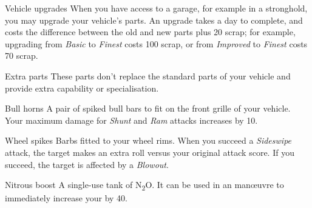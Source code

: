 \begin{abstractsection}{Vehicle upgrades}
  When you have access to a garage, for example in a stronghold, you may upgrade your vehicle's parts. An upgrade takes a day to complete, and costs the difference between the old and new parts plus 20 scrap; for example, upgrading from \emph{Basic} to \emph{Finest} costs 100 scrap, or from \emph{Improved} to \emph{Finest} costs 70 scrap.
\end{abstractsection}

\begin{abstractsection}{Extra parts}
These parts don't replace the standard parts of your vehicle and provide extra capability or specialisation.

\begin{describe}{Bull horns}
  A pair of spiked bull bars to fit on the front grille of your vehicle. Your maximum damage for \emph{Shunt} and \emph{Ram} attacks increases by 10.
\end{describe}

\begin{describe}{Wheel spikes}
  Barbs fitted to your wheel rims. When you succeed a \emph{Sideswipe} attack, the target makes an extra  roll versus your original attack score. If you succeed, the target is affected by a \emph{Blowout}.
\end{describe}

\begin{describe}{Nitrous boost}
  A single-use tank of N\textsubscript{2}O. It can be used in an \duration{\durationInstant{}} man\oe{}uvre to immediately increase your  by 40.
\end{describe}

\end{abstractsection}
